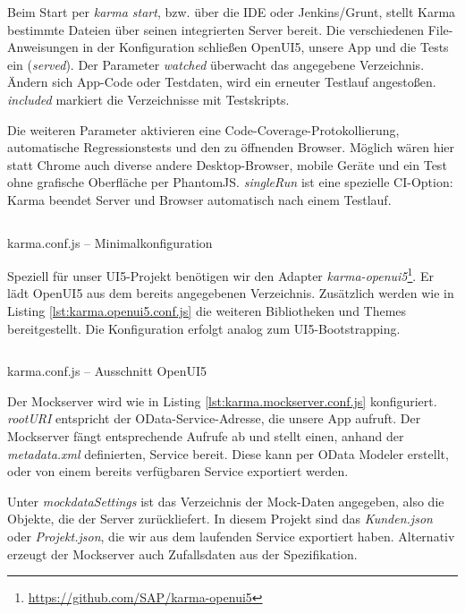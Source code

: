 Beim Start per \textit{karma start}, bzw. über die IDE oder Jenkins/Grunt, stellt Karma bestimmte Dateien über seinen integrierten Server bereit. Die verschiedenen File-Anweisungen in der Konfiguration schließen OpenUI5, unsere App und die Tests ein (\textit{served}). Der Parameter \textit{watched} überwacht das angegebene Verzeichnis. Ändern sich App-Code oder Testdaten, wird ein erneuter Testlauf angestoßen. \textit{included} markiert die Verzeichnisse mit Testskripts.

Die weiteren Parameter aktivieren eine Code-Coverage-Protokollierung, automatische Regressionstests und den zu öffnenden Browser. Möglich wären hier statt Chrome auch diverse andere Desktop-Browser, mobile Geräte und ein Test ohne grafische Oberfläche per PhantomJS. \textit{singleRun} ist eine spezielle CI-Option: Karma beendet Server und Browser automatisch nach einem Testlauf.

\begin{listing}[H]
	\inputminted[tabsize=2]{js}{src/karma.conf.js}
	\caption{karma.conf.js -- Minimalkonfiguration}
	\label{lst:karma.conf.js}
\end{listing}

Speziell für unser UI5-Projekt benötigen wir den Adapter \textit{karma-openui5}\footnote{\url{https://github.com/SAP/karma-openui5}}. Er lädt OpenUI5 aus dem bereits angegebenen Verzeichnis. Zusätzlich werden wie in Listing \ref{lst:karma.openui5.conf.js} die weiteren Bibliotheken und Themes bereitgestellt. Die Konfiguration erfolgt analog zum UI5-Bootstrapping.

\begin{listing}[H]
	\inputminted[tabsize=2]{js}{src/karma.openui5.conf.js}
	\caption{karma.conf.js -- Ausschnitt OpenUI5}
	\label{lst:karma.openui5.conf.js}
\end{listing}

Der Mockserver wird wie in Listing \ref{lst:karma.mockserver.conf.js} konfiguriert. \textit{rootURI} entspricht der OData-Service-Adresse, die unsere App aufruft. Der Mockserver fängt entsprechende Aufrufe ab und stellt einen, anhand der \textit{metadata.xml} definierten, Service bereit. Diese kann per OData Modeler erstellt, oder von einem bereits verfügbaren Service exportiert werden.

Unter \textit{mockdataSettings} ist das Verzeichnis der Mock-Daten angegeben, also die Objekte, die der Server zurückliefert. In diesem Projekt sind das \zB \textit{Kunden.json} oder \textit{Projekt.json}, die wir aus dem laufenden Service exportiert haben. Alternativ erzeugt der Mockserver auch Zufallsdaten aus der Spezifikation.

